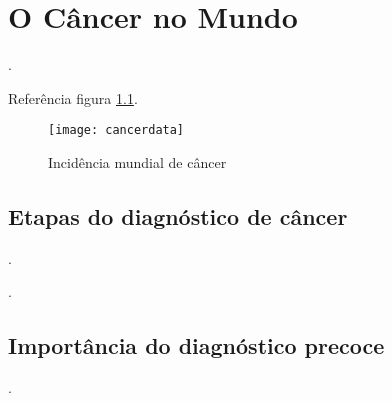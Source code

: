 \chapter{O Câncer no Mundo}
\label{chapter:o_cancer_no_mundo}

\cite{OQUEECANCER}.

\cite{MOC}

Referência figura \ref{fig:cancerdata}.

\begin{figure}[H]
\begin{center}
\caption{Incidência mundial de câncer}
\texttt{[image: cancerdata]}
\label{fig:cancerdata}
\end{center}
\end{figure}

\section{\textbf{Etapas do diagnóstico de câncer}}

\cite{ATLAS}.

\cite{VENCER}.

\section{\textbf{Importância do diagnóstico precoce}}

\cite{DIAGNOSTICO}.

